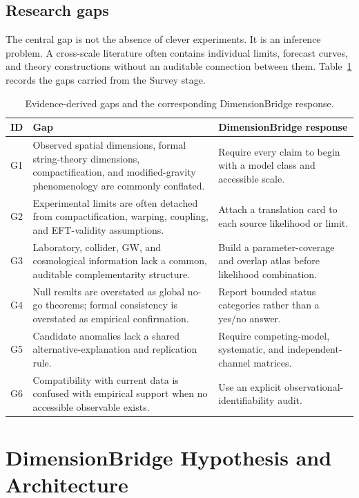 \documentclass[conference]{IEEEtran}
\begin{document}
\subsection{Research gaps}

The central gap is not the absence of clever experiments. It is an inference problem. A cross-scale literature often contains individual limits, forecast curves, and theory constructions without an auditable connection between them. Table~\ref{tab:gaps} records the gaps carried from the Survey stage.

\begin{table}[t]
\caption{Evidence-derived gaps and the corresponding DimensionBridge response.}
\label{tab:gaps}
\centering
\footnotesize
\setlength{\tabcolsep}{3pt}
\begin{tabular}{p{} p{} p{}}
\toprule
\textbf{ID} & \textbf{Gap} & \textbf{DimensionBridge response} \\
\midrule
G1 & Observed spatial dimensions, formal string-theory dimensions, compactification, and modified-gravity phenomenology are commonly conflated. & Require every claim to begin with a model class and accessible scale. \\
G2 & Experimental limits are often detached from compactification, warping, coupling, and EFT-validity assumptions. & Attach a translation card to each source likelihood or limit. \\
G3 & Laboratory, collider, GW, and cosmological information lack a common, auditable complementarity structure. & Build a parameter-coverage and overlap atlas before likelihood combination. \\
G4 & Null results are overstated as global no-go theorems; formal consistency is overstated as empirical confirmation. & Report bounded status categories rather than a yes/no answer. \\
G5 & Candidate anomalies lack a shared alternative-explanation and replication rule. & Require competing-model, systematic, and independent-channel matrices. \\
G6 & Compatibility with current data is confused with empirical support when no accessible observable exists. & Use an explicit observational-identifiability audit. \\
\bottomrule
\end{tabular}
\end{table}

\section{DimensionBridge Hypothesis and Architecture}
\end{document}
